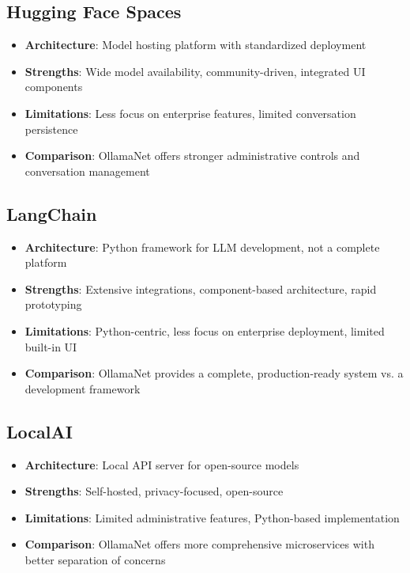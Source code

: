 \subsection*{Hugging Face Spaces}
\begin{itemize}
    \item \textbf{Architecture}: Model hosting platform with standardized deployment
    \item \textbf{Strengths}: Wide model availability, community-driven, integrated UI components
    \item \textbf{Limitations}: Less focus on enterprise features, limited conversation persistence
    \item \textbf{Comparison}: OllamaNet offers stronger administrative controls and conversation management
\end{itemize}

\subsection*{LangChain}
\begin{itemize}
    \item \textbf{Architecture}: Python framework for LLM development, not a complete platform
    \item \textbf{Strengths}: Extensive integrations, component-based architecture, rapid prototyping
    \item \textbf{Limitations}: Python-centric, less focus on enterprise deployment, limited built-in UI
    \item \textbf{Comparison}: OllamaNet provides a complete, production-ready system vs. a development framework
\end{itemize}

\subsection*{LocalAI}
\begin{itemize}
    \item \textbf{Architecture}: Local API server for open-source models
    \item \textbf{Strengths}: Self-hosted, privacy-focused, open-source
    \item \textbf{Limitations}: Limited administrative features, Python-based implementation
    \item \textbf{Comparison}: OllamaNet offers more comprehensive microservices with better separation of concerns
\end{itemize}

